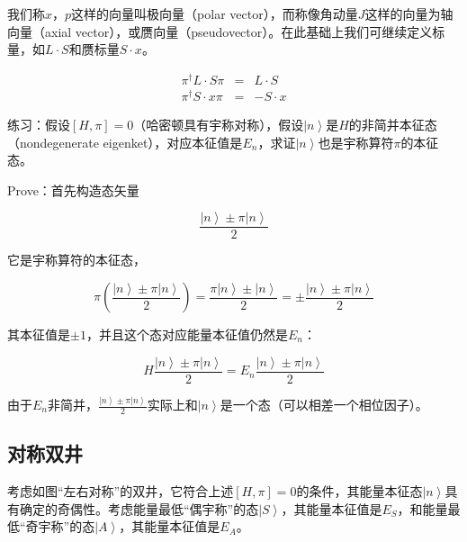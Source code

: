我们称$x$，$p$这样的向量叫极向量（polar vector），而称像角动量$J$这样的向量为轴向量（axial vector），或赝向量（pseudovector）。在此基础上我们可继续定义标量，如$L \cdot S$和赝标量$S \cdot x$。

\begin{eqnarray}
\pi^\dagger L \cdot S  \pi & = & L \cdot S \\
\pi^\dagger  S \cdot x  \pi & = & - S \cdot x
\end{eqnarray}

练习：假设$[H, \pi] = 0$（哈密顿具有宇称对称），假设$\left| n \right\rangle$是$H$的非简并本征态（nondegenerate eigenket），对应本征值是$E_n$，求证$\left| n \right\rangle$也是宇称算符$\pi$的本征态。

Prove：首先构造态矢量

\begin{equation}
\frac{ \left| n \right\rangle \pm \pi \left| n \right\rangle }{2}
\end{equation}

它是宇称算符的本征态，

\begin{equation}
\pi \left( \frac{ \left| n \right\rangle \pm \pi \left| n \right\rangle }{2}  \right) = \frac{ \pi \left| n \right\rangle \pm \left| n \right\rangle }{2} = \pm \frac{\left| n \right\rangle \pm \pi \left| n \right\rangle}{2}
\end{equation}

其本征值是$\pm 1$，并且这个态对应能量本征值仍然是$E_n$：

\begin{equation}
H \frac{ \left| n \right\rangle \pm \pi \left| n \right\rangle }{2} = E_n \frac{ \left| n \right\rangle \pm \pi \left| n \right\rangle }{2}
\end{equation}

由于$E_n$非简并，$\frac{ \left| n \right\rangle \pm \pi \left| n \right\rangle }{2}$实际上和$\left| n \right\rangle$是一个态（可以相差一个相位因子）。

\subsection{对称双井}

考虑如图“左右对称”的双井，它符合上述$[ H, \pi ] = 0$的条件，其能量本征态$\left| n \right\rangle$具有确定的奇偶性。考虑能量最低“偶宇称”的态$\left| S \right\rangle$，其能量本征值是$E_S$，和能量最低“奇宇称”的态$\left| A \right\rangle$，其能量本征值是$E_A$。

